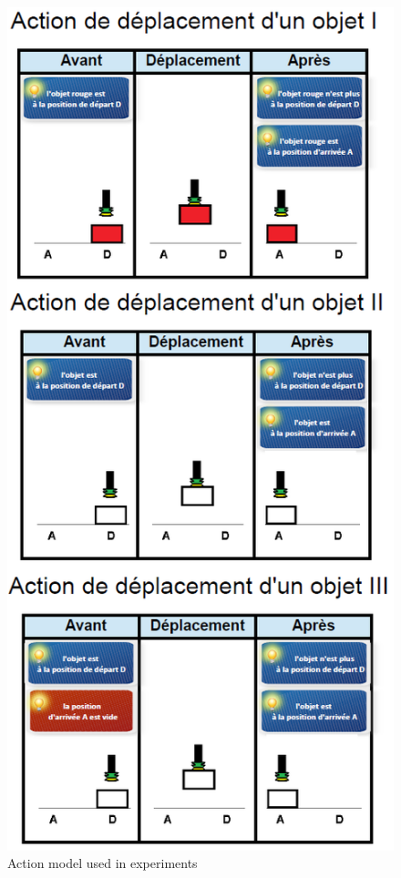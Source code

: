

  \begin{figure}[h]
    \centering
    \includegraphics[scale=0.7]{figures/schema-all}
    \caption{Action model used in experiments}
    \label{fig:schema-all}
  \end{figure}


